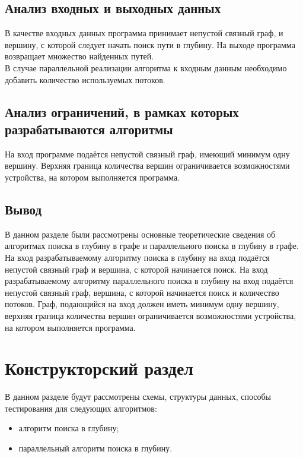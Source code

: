 \section{Анализ входных и выходных данных}
В качестве входных данных программа принимает непустой связный граф, и вершину, с которой следует начать поиск пути в глубину. На выходе программа возвращает множество найденных путей.\\

В случае параллельной реализации алгоритма к входным данным необходимо добавить количество используемых потоков.\\

\section{Анализ ограничений, в рамках которых разрабатываются алгоритмы}
На вход программе подаётся непустой связный граф, имеющий минимум одну вершину. Верхняя граница количества вершин ограничивается возможностями устройства, на котором выполняется программа.

\section{Вывод}
В данном разделе были рассмотрены основные теоретические сведения об алгоритмах поиска в глубину в графе и параллельного поиска в глубину в графе. На вход разрабатываемому алгоритму поиска в глубину на вход подаётся непустой связный граф и вершина, с которой начинается поиск. На вход разрабатываемому алгоритму параллельного поиска в глубину на вход подаётся непустой связный граф, вершина, с которой начинается поиск и количество потоков. Граф, подающийся на вход должен иметь минимум одну вершину, верхняя граница количества вершин ограничивается возможностями устройства, на котором выполняется программа. 

\chapter{Конструкторский раздел}

В данном разделе будут рассмотрены схемы, структуры данных, способы тестирования для следующих алгоритмов:
\begin{itemize}
	\item алгоритм поиска в глубину;
	\item параллельный алгоритм поиска в глубину.
\end{itemize}

